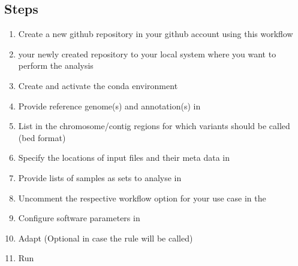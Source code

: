 \documentclass[letterpaper,10pt,english]{sphinxhowto}
\begin{document}
\subsection{Steps}
\label{\detokenize{index:steps}}\begin{enumerate}
%
\item {} 
Create a new github repository in your github account using this workflow 

\item {} 
 your newly created repository to your local system where you want to perform the analysis

\item {} 
Create and activate the conda environment

\item {} 
Provide reference genome(s) and annotation(s) in 

\item {} 
List in  the chromosome/contig regions for which variants should be called (bed format)

\item {} 
Specify the locations of input files and their meta data in 

\item {} 
Provide lists of samples as sets to analyse in 

\item {} 
Uncomment the respective workflow option for your use case in the 

\item {} 
Configure software parameters in 

\item {} 
Adapt  (Optional in case the  rule will be called)

\item {} 
Run 

\end{enumerate}
\end{document}
